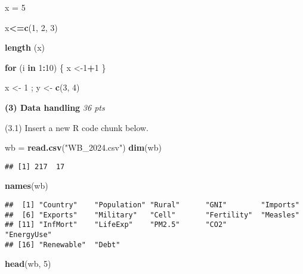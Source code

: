 \documentclass[
]{article}
\newenvironment{Shaded}{\begin{snugshade}}{\end{snugshade}}
\newcommand{\ControlFlowTok}[1]{\textcolor[rgb]{0.13,0.29,0.53}{\textbf{#1}}}
\newcommand{\DecValTok}[1]{\textcolor[rgb]{0.00,0.00,0.81}{#1}}
\newcommand{\FunctionTok}[1]{\textcolor[rgb]{0.13,0.29,0.53}{\textbf{#1}}}
\newcommand{\NormalTok}[1]{#1}
\newcommand{\OtherTok}[1]{\textcolor[rgb]{0.56,0.35,0.01}{#1}}
\newcommand{\SpecialCharTok}[1]{\textcolor[rgb]{0.81,0.36,0.00}{\textbf{#1}}}
\newcommand{\StringTok}[1]{\textcolor[rgb]{0.31,0.60,0.02}{#1}}
\begin{document}
\begin{Shaded}
\begin{Highlighting}[]
\NormalTok{x }\OtherTok{=} \DecValTok{5}

\NormalTok{x}\SpecialCharTok{\textless{}=}\FunctionTok{c}\NormalTok{(}\DecValTok{1}\NormalTok{, }\DecValTok{2}\NormalTok{, }\DecValTok{3}\NormalTok{)}

\FunctionTok{length}\NormalTok{ (x)}

\ControlFlowTok{for}\NormalTok{ (i }\ControlFlowTok{in} \DecValTok{1}\SpecialCharTok{:}\DecValTok{10}\NormalTok{) \{ }
\NormalTok{x }\OtherTok{\textless{}{-}}\DecValTok{1}\SpecialCharTok{+}\DecValTok{1} 
\NormalTok{           \}}

\NormalTok{x }\OtherTok{\textless{}{-}} \DecValTok{1}\NormalTok{ ; y }\OtherTok{\textless{}{-}} \FunctionTok{c}\NormalTok{(}\DecValTok{3}\NormalTok{, }\DecValTok{4}\NormalTok{)}
\end{Highlighting}
\end{Shaded}

\textbf{(3) Data handling} \emph{36 pts}

(3.1) Insert a new R code chunk below.

\begin{Shaded}
\begin{Highlighting}[]
\NormalTok{wb }\OtherTok{=} \FunctionTok{read.csv}\NormalTok{(}\StringTok{"WB\_2024.csv"}\NormalTok{)}
\FunctionTok{dim}\NormalTok{(wb)}
\end{Highlighting}
\end{Shaded}

\begin{verbatim}
## [1] 217  17
\end{verbatim}

\begin{Shaded}
\begin{Highlighting}[]
\FunctionTok{names}\NormalTok{(wb)}
\end{Highlighting}
\end{Shaded}

\begin{verbatim}
##  [1] "Country"    "Population" "Rural"      "GNI"        "Imports"   
##  [6] "Exports"    "Military"   "Cell"       "Fertility"  "Measles"   
## [11] "InfMort"    "LifeExp"    "PM2.5"      "CO2"        "EnergyUse" 
## [16] "Renewable"  "Debt"
\end{verbatim}

\begin{Shaded}
\begin{Highlighting}[]
\FunctionTok{head}\NormalTok{(wb, }\DecValTok{5}\NormalTok{)}
\end{Highlighting}
\end{Shaded}
\end{document}
